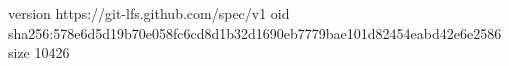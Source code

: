 version https://git-lfs.github.com/spec/v1
oid sha256:578e6d5d19b70e058fc6cd8d1b32d1690eb7779bae101d82454eabd42e6e2586
size 10426

